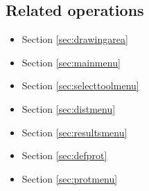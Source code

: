   \subsection*{Related operations}
  \begin{itemize}
  \item Section \ref{sec:drawingarea}
  \item Section \ref{sec:mainmenu}
  \item Section \ref{sec:selecttoolmenu}
  \item Section \ref{sec:distmenu}
  \item Section \ref{sec:resultsmenu}
  \item Section \ref{sec:defprot}
  \item Section \ref{sec:protmenu}
  \end{itemize}
